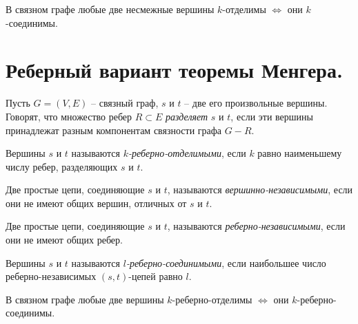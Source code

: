 \begin{theorem}[Менгер]
    В связном графе любые две несмежные вершины $ k $-отделимы $ \iff $ они $ k $-соединимы.
\end{theorem}

\section{Реберный вариант теоремы Менгера.}

\begin{definition}
    Пусть $ G = (V,E) $ -- связный граф, $ s $ и $ t $ -- две его произвольные вершины. Говорят, что множество ребер $ R \subset E $ \emph{разделяет} $ s $ и $ t $, если эти вершины принадлежат разным компонентам связности графа $ G - R $.
\end{definition}

\begin{definition}
    Вершины $ s $ и $ t $ называются \emph{$ k $-реберно-отделимыми}, если $ k $ равно наименьшему числу ребер, разделяющих $ s $ и $ t $.
\end{definition}

\begin{definition}
    Две простые цепи, соединяющие $ s $ и $ t $, называются \emph{вершинно-независимыми}, если они не имеют общих вершин, отличных от $ s $ и $ t $.
\end{definition}

\begin{definition}
    Две простые цепи, соединяющие $ s $ и $ t $, называются \emph{реберно-независимыми}, если они не имеют общих ребер.
\end{definition}

\begin{definition}
    Вершины $ s $ и $ t $ называются \emph{$ l $-реберно-соединимыми}, если наибольшее число \\ реберно-независимых $ (s,t) $-цепей равно $ l $.
\end{definition}

\begin{theorem}
    В связном графе любые две вершины $ k $-реберно-отделимы $ \iff $ они $ k $-реберно-соединимы.
\end{theorem}